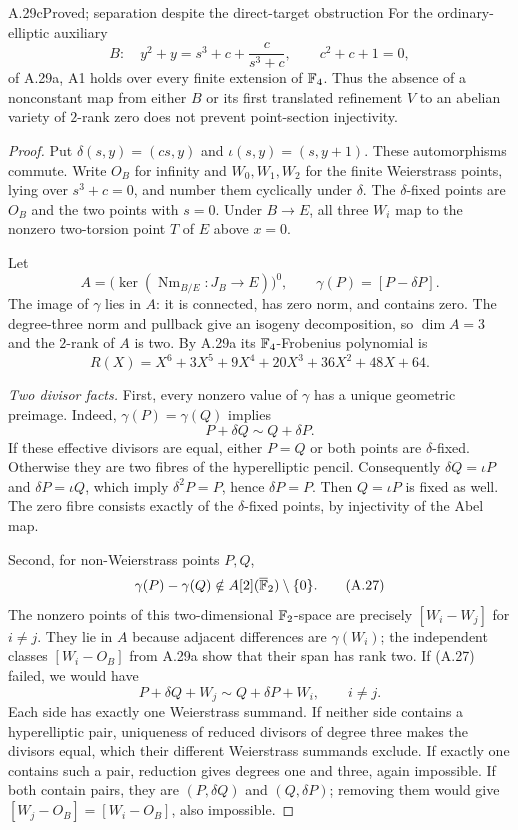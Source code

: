\begin{claim}{A.29c}{Proved; separation despite the direct-target obstruction}
For the ordinary-elliptic auxiliary
\[
 B:\quad y^2+y=s^3+c+\frac{c}{s^3+c},\qquad c^2+c+1=0,
\]
of A.29a, A1 holds over every finite extension of $\mathbb F_4$.
Thus the absence of a nonconstant map from either $B$ or its
first translated refinement $V$ to an abelian variety of
$2$-rank zero does not prevent point-section injectivity.
\end{claim}
\begin{proof}
Put $\delta(s,y)=(cs,y)$ and $\iota(s,y)=(s,y+1)$.
These automorphisms commute. Write $O_B$ for infinity and
$W_0,W_1,W_2$ for the finite Weierstrass points, lying over
$s^3+c=0$, and number them cyclically under $\delta$.
The $\delta$-fixed points are $O_B$ and the two points with
$s=0$. Under $B\to E$, all three $W_i$ map to the nonzero
two-torsion point $T$ of $E$ above $x=0$.

Let
\[
 A=\bigl(\ker(\operatorname{Nm}_{B/E}:J_B\to E)\bigr)^0,
 \qquad \gamma(P)=[P-\delta P].
\]
The image of $\gamma$ lies in $A$: it is connected, has
zero norm, and contains zero. The degree-three norm and
pullback give an isogeny decomposition, so
$\dim A=3$ and the $2$-rank of $A$ is two. By A.29a its
$\mathbb F_4$-Frobenius polynomial is
\[
 R(X)=X^6+3X^5+9X^4+20X^3+36X^2+48X+64.                \tag{A.26}
\]

\emph{Two divisor facts.}
First, every nonzero value of $\gamma$ has a unique
geometric preimage. Indeed, $\gamma(P)=\gamma(Q)$ implies
\[
 P+\delta Q\sim Q+\delta P.
\]
If these effective divisors are equal, either $P=Q$ or
both points are $\delta$-fixed. Otherwise they are two
fibres of the hyperelliptic pencil. Consequently
$\delta Q=\iota P$ and $\delta P=\iota Q$, which imply
$\delta^2P=P$, hence $\delta P=P$. Then $Q=\iota P$
is fixed as well. The zero fibre consists exactly of the
$\delta$-fixed points, by injectivity of the Abel map.

Second, for non-Weierstrass points $P,Q$,
\[
 \gamma(P)-\gamma(Q)\notin A[2](\overline{\mathbb F}_2)
                                      \setminus\{0\}.    \tag{A.27}
\]
The nonzero points of this two-dimensional $\mathbb F_2$-space
are precisely $[W_i-W_j]$ for $i\ne j$. They lie in $A$
because adjacent differences are $\gamma(W_i)$; the
independent classes $[W_i-O_B]$ from A.29a show that
their span has rank two. If (A.27) failed, we would have
\[
 P+\delta Q+W_j\sim Q+\delta P+W_i,\qquad i\ne j.        \tag{A.28}
\]
Each side has exactly one Weierstrass summand. If neither
side contains a hyperelliptic pair, uniqueness of reduced
divisors of degree three makes the divisors equal, which
their different Weierstrass summands exclude. If exactly
one contains such a pair, reduction gives degrees one and
three, again impossible. If both contain pairs, they are
$(P,\delta Q)$ and $(Q,\delta P)$; removing them would
give $[W_j-O_B]=[W_i-O_B]$, also impossible.


\end{proof}

